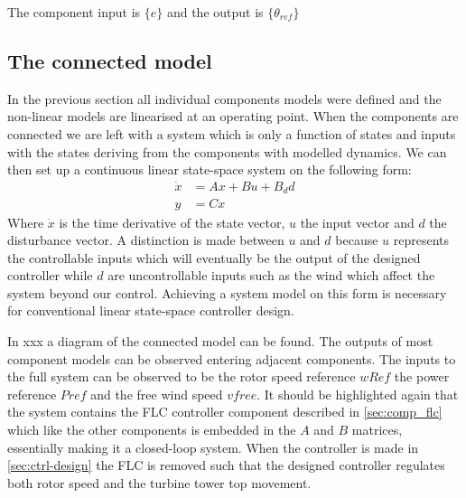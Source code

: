 The component input is $ \{e \} $ and the output is $ \{\theta_{ref} \} $


%
%


\subsection{The connected model} \label{sec:comp_connected}
In the previous section all individual components models were defined and the non-linear models are linearised at an operating point. When the components are connected we are left with a system which is only a function of states and inputs with the states deriving from the components with modelled dynamics. We can then set up a continuous linear state-space system on the following form:
\begin{equation}\label{eq:state-space-sys}
	\begin{split}
		\dot x &= A x + B u + B_d d \\
		y &= Cx
	\end{split}
\end{equation}
Where $ \dot x $ is the time derivative of the state vector, $ u $ the input vector and $ d $ the disturbance vector. A distinction is made between $ u $ and $ d $ because $ u $ represents the controllable inputs which will eventually be the output of the designed controller while $ d $ are uncontrollable inputs such as the wind which affect the system beyond our control. Achieving a system model on this form is necessary for conventional linear state-space controller design.

In xxx a diagram of the connected model can be found. The outputs of most component models can be observed entering adjacent components. The inputs to the full system can be observed to be the rotor speed reference $ wRef $ the power reference $ Pref $ and the free wind speed $ vfree $. It should be highlighted again that the system contains the FLC controller component described in \cref{sec:comp_flc} which like the other components is embedded in the $ A $ and $ B $ matrices, essentially making it a closed-loop system. When the controller is made in \cref{sec:ctrl-design} the FLC is removed such that the designed controller regulates both rotor speed and the turbine tower top movement.

